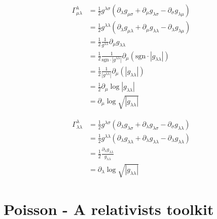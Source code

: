 \documentclass[10pt,a4paper]{book}
\theoremstyle{definition}
\begin{document}
\begin{align}
\Gamma^\lambda_{\mu\lambda}
&=\frac{1}{2}g^{\lambda\sigma}(\partial_\lambda g_{\mu\sigma}+\partial_\mu g_{\lambda\sigma}-\partial_\sigma g_{\lambda\mu})\\
&=\frac{1}{2}g^{\lambda\lambda}(\partial_\lambda g_{\mu\lambda}+\partial_\mu g_{\lambda\lambda}-\partial_\lambda g_{\lambda\mu})\\
&=\frac{1}{2}\frac{1}{g^{\lambda\lambda}}\partial_\mu g_{\lambda\lambda}\\
&=\frac{1}{2}\frac{1}{\text{sgn}\cdot|g^{\lambda\lambda}|}\partial_\mu (\text{sgn}\cdot|g_{\lambda\lambda}|)\\
&=\frac{1}{2}\frac{1}{|g^{\lambda\lambda}|}\partial_\mu (|g_{\lambda\lambda}|)\\
&=\frac{1}{2}\partial_\mu \log|g_{\lambda\lambda}|\\
&=\partial_\mu \log\sqrt{|g_{\lambda\lambda}|}
\end{align}

\begin{align}
\Gamma^\lambda_{\lambda\lambda}
&=\frac{1}{2}g^{\lambda\sigma}(\partial_\lambda g_{\lambda\sigma}+\partial_\lambda g_{\lambda\sigma}-\partial_\sigma g_{\lambda\lambda})\\
&=\frac{1}{2}g^{\lambda\lambda}(\partial_\lambda g_{\lambda\lambda}+\partial_\lambda g_{\lambda\lambda}-\partial_\lambda g_{\lambda\lambda})\\
&=\frac{1}{2}\frac{\partial_\lambda g_{\lambda\lambda}}{g_{\lambda\lambda}}\\
&=\partial_\lambda \log \sqrt{|g_{\lambda\lambda}|}
\end{align}

\section{{\sc Poisson} - A relativists toolkit}
\end{document}
